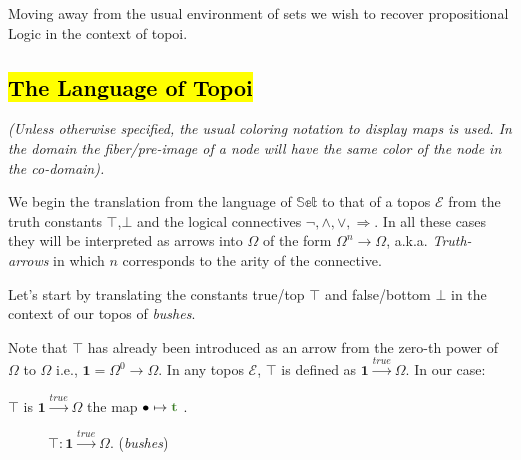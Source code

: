 Moving away from the usual environment of sets we wish to recover propositional Logic in the context of topoi.


\subsection{\hl{The Language of Topoi}}
 
\emph{	(Unless otherwise specified, the usual coloring notation to display maps is used. In the domain the fiber/pre-image of a node will have the same color of the node in the co-domain).} \newline

We begin the translation from the language of $\mathbb{Set}$ to that of a topos $\mathcal{E}$ from the truth constants $\top$,$\bot$ and the logical connectives $\neg,\land,\lor,\Rightarrow$. \newline
In all these cases they will be interpreted as arrows into $\Omega$ of the form $\Omega^n \rightarrow \Omega$, a.k.a. \emph{Truth-arrows} in which $n$ corresponds to the arity of the connective. \newline

Let's start by translating the constants true/top $\top$ and false/bottom $\bot$ in the context of our topos of \emph{bushes}.
\newline

Note that $\top$ has already been introduced as an arrow from the zero-th power of $\Omega$ to $\Omega$ i.e., $\textbf{1}= \Omega^0  \rightarrow \Omega$.
\newline In any topos $\mathcal{E}$, $\top$ is defined as $\textbf{1} \xrightarrow{true} \Omega$. In our case:
\begin{definition}[$\top$]
	$\top$ is $\textbf{1} \xrightarrow{true} \Omega$ the map $\bullet \mapsto \textcolor{OliveGreen}{\textbf{t}}$ .
\end{definition}

\begin{figure}[h]
	\centering
	\caption{$\top : \mathbf{1} \xrightarrow{true} \Omega$. (\emph{bushes})}
\end{figure}

